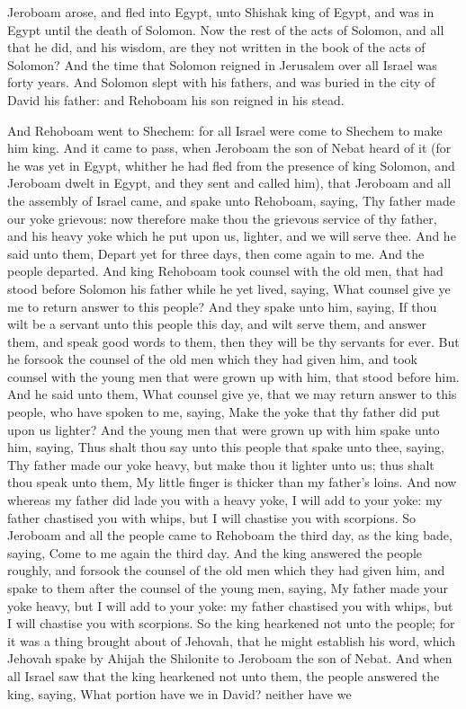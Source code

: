 Jeroboam arose, and fled into Egypt, unto Shishak king of Egypt, and was in Egypt until the death of Solomon.  Now the rest of the acts of Solomon, and all that he did, and his wisdom, are they not written in the book of the acts of Solomon? And the time that Solomon reigned in Jerusalem over all Israel was forty years. And Solomon slept with his fathers, and was buried in the city of David his father: and Rehoboam his son reigned in his stead. 

And Rehoboam went to Shechem: for all Israel were come to Shechem to make him king. And it came to pass, when Jeroboam the son of Nebat heard of it (for he was yet in Egypt, whither he had fled from the presence of king Solomon, and Jeroboam dwelt in Egypt, and they sent and called him), that Jeroboam and all the assembly of Israel came, and spake unto Rehoboam, saying, Thy father made our yoke grievous: now therefore make thou the grievous service of thy father, and his heavy yoke which he put upon us, lighter, and we will serve thee. And he said unto them, Depart yet for three days, then come again to me. And the people departed.  And king Rehoboam took counsel with the old men, that had stood before Solomon his father while he yet lived, saying, What counsel give ye me to return answer to this people? And they spake unto him, saying, If thou wilt be a servant unto this people this day, and wilt serve them, and answer them, and speak good words to them, then they will be thy servants for ever. But he forsook the counsel of the old men which they had given him, and took counsel with the young men that were grown up with him, that stood before him. And he said unto them, What counsel give ye, that we may return answer to this people, who have spoken to me, saying, Make the yoke that thy father did put upon us lighter? And the young men that were grown up with him spake unto him, saying, Thus shalt thou say unto this people that spake unto thee, saying, Thy father made our yoke heavy, but make thou it lighter unto us; thus shalt thou speak unto them, My little finger is thicker than my father’s loins. And now whereas my father did lade you with a heavy yoke, I will add to your yoke: my father chastised you with whips, but I will chastise you with scorpions.  So Jeroboam and all the people came to Rehoboam the third day, as the king bade, saying, Come to me again the third day. And the king answered the people roughly, and forsook the counsel of the old men which they had given him, and spake to them after the counsel of the young men, saying, My father made your yoke heavy, but I will add to your yoke: my father chastised you with whips, but I will chastise you with scorpions. So the king hearkened not unto the people; for it was a thing brought about of Jehovah, that he might establish his word, which Jehovah spake by Ahijah the Shilonite to Jeroboam the son of Nebat.  And when all Israel saw that the king hearkened not unto them, the people answered the king, saying, What portion have we in David? neither have we 